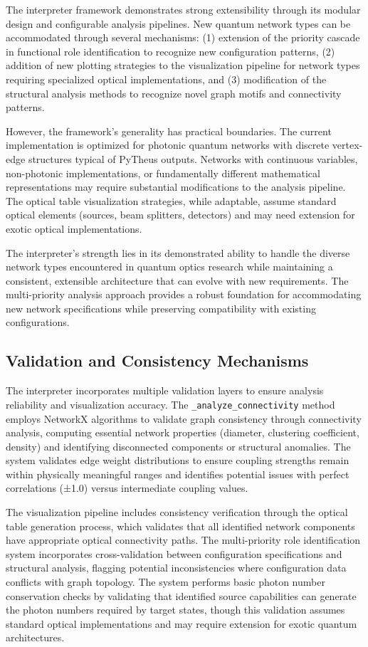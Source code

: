 \documentclass[11pt,a4paper]{article}
\begin{document}
The interpreter framework demonstrates strong extensibility through its modular design and configurable analysis pipelines. New quantum network types can be accommodated through several mechanisms: (1) extension of the priority cascade in functional role identification to recognize new configuration patterns, (2) addition of new plotting strategies to the visualization pipeline for network types requiring specialized optical implementations, and (3) modification of the structural analysis methods to recognize novel graph motifs and connectivity patterns.

However, the framework's generality has practical boundaries. The current implementation is optimized for photonic quantum networks with discrete vertex-edge structures typical of PyTheus outputs. Networks with continuous variables, non-photonic implementations, or fundamentally different mathematical representations may require substantial modifications to the analysis pipeline. The optical table visualization strategies, while adaptable, assume standard optical elements (sources, beam splitters, detectors) and may need extension for exotic optical implementations.

The interpreter's strength lies in its demonstrated ability to handle the diverse network types encountered in quantum optics research while maintaining a consistent, extensible architecture that can evolve with new requirements. The multi-priority analysis approach provides a robust foundation for accommodating new network specifications while preserving compatibility with existing configurations.

\subsection{Validation and Consistency Mechanisms}

The interpreter incorporates multiple validation layers to ensure analysis reliability and visualization accuracy. The \texttt{\_analyze\_connectivity} method employs NetworkX algorithms to validate graph consistency through connectivity analysis, computing essential network properties (diameter, clustering coefficient, density) and identifying disconnected components or structural anomalies. The system validates edge weight distributions to ensure coupling strengths remain within physically meaningful ranges and identifies potential issues with perfect correlations (±1.0) versus intermediate coupling values.

The visualization pipeline includes consistency verification through the optical table generation process, which validates that all identified network components have appropriate optical connectivity paths. The multi-priority role identification system incorporates cross-validation between configuration specifications and structural analysis, flagging potential inconsistencies where configuration data conflicts with graph topology. The system performs basic photon number conservation checks by validating that identified source capabilities can generate the photon numbers required by target states, though this validation assumes standard optical implementations and may require extension for exotic quantum architectures.
\end{document}
